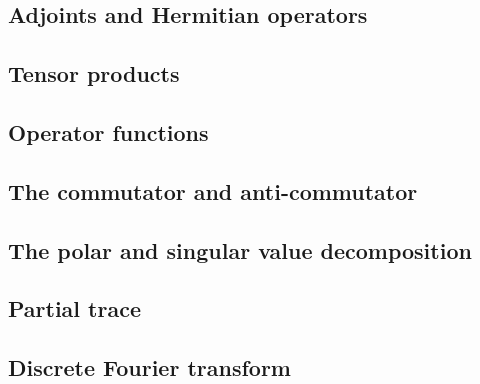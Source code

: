 \documentclass[
	11pt, %
	a4paper, %
]{LegrandOrangeBook}
\begin{document}
\subsection{Adjoints and Hermitian operators} %


\subsection{Tensor products} %


\subsection{Operator functions} %


\subsection{The commutator and anti-commutator} %


\subsection{The polar and singular value decomposition} %


\subsection{Partial trace} %


\subsection{Discrete Fourier transform} %



\end{document}
